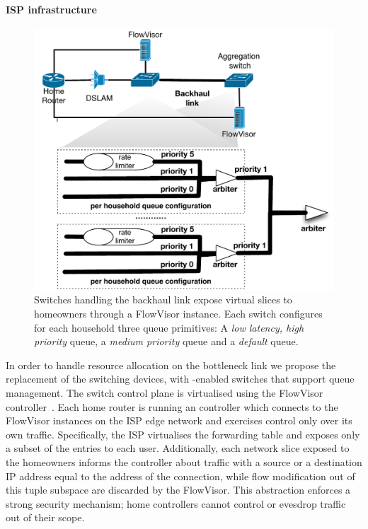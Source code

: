 \paragraph*{ISP infrastructure}

\begin{figure}
  \centering
  \includegraphics[width=0.7\columnwidth]{queue_design}
  \caption{\label{fig:queue_design} Switches handling the backhaul link expose 
    virtual slices to homeowners through a FlowVisor instance.  Each switch
    configures for each household three queue primitives: A {\it low latency,
      high priority} queue, a {\it medium priority} queue and a {\it default}
    queue.}
\end{figure}


In order to handle resource allocation on the bottleneck link we propose the
replacement of the switching devices, with \of-enabled switches that support
queue management. The switch control plane is virtualised using the FlowVisor
controller~\cite{flowvisor-osdi}. Each home router is running an \of controller
which connects to the FlowVisor instances on the ISP edge network and exercises
control only over its own traffic. Specifically, the ISP virtualises the \of
forwarding table and exposes only a subset of the entries to each user.
Additionally, each network slice exposed to the homeowners informs the
controller about traffic with a source or a destination IP address equal to the
address of the connection, while flow modification out of this tuple subspace
are discarded by the FlowVisor. This abstraction enforces a strong security
mechanism; home controllers cannot control or evesdrop traffic out of their
scope. 

